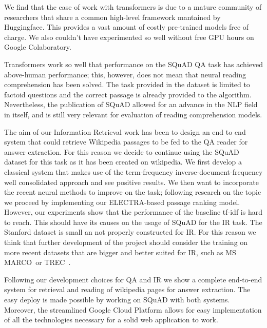 \documentclass{article}
\begin{document}
We find that the ease of work with transformers is due to a mature community of researchers that share a common high-level framework mantained by Huggingface. This provides a vast  amount of costly pre-trained models free of charge.
We also couldn't have experimented so well without free GPU hours on Google Colaboratory.

Transformers work so well that performance on the SQuAD QA task has achieved above-human performance; this, however, does not mean that neural reading comprehension has been solved.
The task provided in the dataset is limited to factoid questions and the correct passage is already provided to the algorithm.
Nevertheless, the publication of SQuAD allowed for an advance in the NLP field in itself, and is still very relevant for evaluation of reading comprehension models.
\newline
\newline

The aim of our Information Retrieval work has been to design an end to end system that could retrieve Wikipedia passages to be fed to the QA reader for answer extraction.
For this reason we decide to continue using the SQuAD dataset for this task as it has been created on wikipedia.
We first develop a classical system that makes use of the term-frequency inverse-document-frequency well consolidated approach and see positive results.
We then want to incorporate the recent neural methods to improve on the task; following research on the topic we proceed by implementing our ELECTRA-based passage ranking model.
However, our experiments show that the performance of the baseline tf-idf is hard to reach. This should have its causes on the usage of SQuAD for the IR task. The Stanford dataset is small an not properly constructed for IR.
For this reason we think that further development of the project should consider the training on more recent datasets that are bigger and better suited for IR, such as MS MARCO~\cite{bajaj2018ms}or TREC~\cite{TREC}.
\newline
\newline

Following our development choices for QA and IR we show a complete end-to-end system for retrieval and reading of wikipedia pages for answer extraction.
The easy deploy is made possible by working on SQuAD with both systems.
Moreover, the streamlined Google Cloud Platform allows for easy implementation of all the technologies necessary for a solid web application to work.




\end{document}
